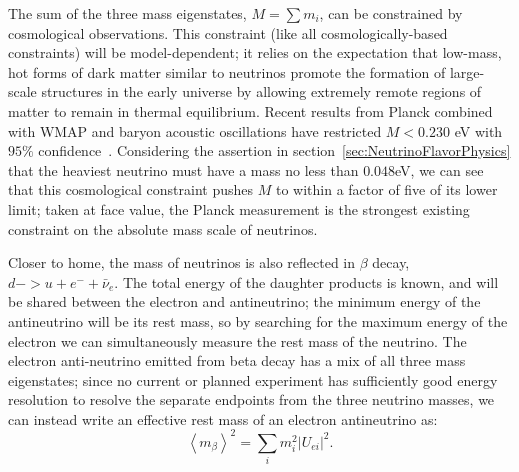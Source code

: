 The sum of the three mass eigenstates, $M = \sum m_i$, can be constrained by cosmological observations.  This constraint (like all cosmologically-based constraints) will be model-dependent; it relies on the expectation that low-mass, hot forms of dark matter similar to neutrinos promote the formation of large-scale structures in the early universe by allowing extremely remote regions of matter to remain in thermal equilibrium.  Recent results from Planck combined with WMAP and baryon acoustic oscillations have restricted $M < 0.230$ eV with $95\%$ confidence~\cite{CosmologicalLimits}.  Considering the assertion in section~\ref{sec:NeutrinoFlavorPhysics} that the heaviest neutrino must have a mass no less than $0.048$eV, we can see that this cosmological constraint pushes $M$ to within a factor of five of its lower limit; taken at face value, the Planck measurement is the strongest existing constraint on the absolute mass scale of neutrinos.

Closer to home, the mass of neutrinos is also reflected in $\beta$ decay, $d -> u + e^- + \bar{\nu}_e$.  The total energy of the daughter products is known, and will be shared between the electron and antineutrino; the minimum energy of the antineutrino will be its rest mass, so by searching for the maximum energy of the electron we can simultaneously measure the rest mass of the neutrino.  The electron anti-neutrino emitted from beta decay has a mix of all three mass eigenstates; since no current or planned experiment has sufficiently good energy resolution to resolve the separate endpoints from the three neutrino masses, we can instead write an effective rest mass of an electron antineutrino as:~\cite{RMPbb0n}
\begin{equation} \label{eqn:DefinitionOfMBeta}
\left< m_\beta \right>^2 = \sum_i m_i^2 \left| U_{ei} \right|^2.
\end{equation}

